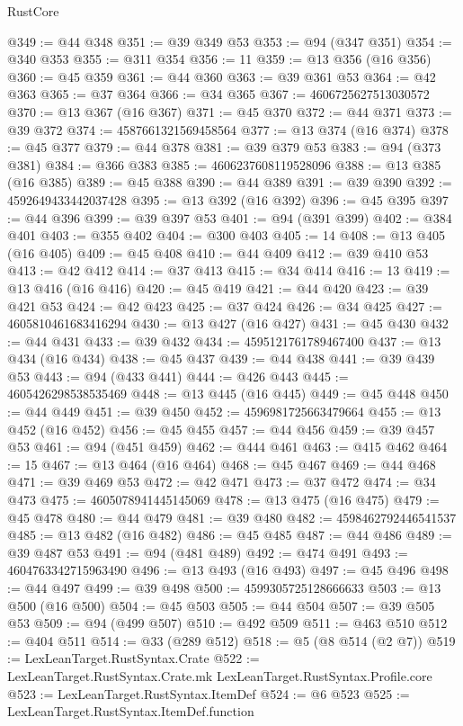 \begin{lexlean}{RustCore}
\begin{coremodule}
@349 := @44 @348
@351 := @39 @349 @53
@353 := @94 (@347 @351)
@354 := @340 @353
@355 := @311 @354
@356 := 11
@359 := @13 @356 (@16 @356)
@360 := @45 @359
@361 := @44 @360
@363 := @39 @361 @53
@364 := @42 @363
@365 := @37 @364
@366 := @34 @365
@367 := 4606725627513030572
@370 := @13 @367 (@16 @367)
@371 := @45 @370
@372 := @44 @371
@373 := @39 @372
@374 := 4587661321569458564
@377 := @13 @374 (@16 @374)
@378 := @45 @377
@379 := @44 @378
@381 := @39 @379 @53
@383 := @94 (@373 @381)
@384 := @366 @383
@385 := 4606237608119528096
@388 := @13 @385 (@16 @385)
@389 := @45 @388
@390 := @44 @389
@391 := @39 @390
@392 := 4592649433442037428
@395 := @13 @392 (@16 @392)
@396 := @45 @395
@397 := @44 @396
@399 := @39 @397 @53
@401 := @94 (@391 @399)
@402 := @384 @401
@403 := @355 @402
@404 := @300 @403
@405 := 14
@408 := @13 @405 (@16 @405)
@409 := @45 @408
@410 := @44 @409
@412 := @39 @410 @53
@413 := @42 @412
@414 := @37 @413
@415 := @34 @414
@416 := 13
@419 := @13 @416 (@16 @416)
@420 := @45 @419
@421 := @44 @420
@423 := @39 @421 @53
@424 := @42 @423
@425 := @37 @424
@426 := @34 @425
@427 := 4605810461683416294
@430 := @13 @427 (@16 @427)
@431 := @45 @430
@432 := @44 @431
@433 := @39 @432
@434 := 4595121761789467400
@437 := @13 @434 (@16 @434)
@438 := @45 @437
@439 := @44 @438
@441 := @39 @439 @53
@443 := @94 (@433 @441)
@444 := @426 @443
@445 := 4605426298538535469
@448 := @13 @445 (@16 @445)
@449 := @45 @448
@450 := @44 @449
@451 := @39 @450
@452 := 4596981725663479664
@455 := @13 @452 (@16 @452)
@456 := @45 @455
@457 := @44 @456
@459 := @39 @457 @53
@461 := @94 (@451 @459)
@462 := @444 @461
@463 := @415 @462
@464 := 15
@467 := @13 @464 (@16 @464)
@468 := @45 @467
@469 := @44 @468
@471 := @39 @469 @53
@472 := @42 @471
@473 := @37 @472
@474 := @34 @473
@475 := 4605078941445145069
@478 := @13 @475 (@16 @475)
@479 := @45 @478
@480 := @44 @479
@481 := @39 @480
@482 := 4598462792446541537
@485 := @13 @482 (@16 @482)
@486 := @45 @485
@487 := @44 @486
@489 := @39 @487 @53
@491 := @94 (@481 @489)
@492 := @474 @491
@493 := 4604763342715963490
@496 := @13 @493 (@16 @493)
@497 := @45 @496
@498 := @44 @497
@499 := @39 @498
@500 := 4599305725128666633
@503 := @13 @500 (@16 @500)
@504 := @45 @503
@505 := @44 @504
@507 := @39 @505 @53
@509 := @94 (@499 @507)
@510 := @492 @509
@511 := @463 @510
@512 := @404 @511
@514 := @33 (@289 @512)
@518 := @5 (@8 @514 (@2 @7))
@519 := LexLeanTarget.RustSyntax.Crate
@522 := LexLeanTarget.RustSyntax.Crate.mk LexLeanTarget.RustSyntax.Profile.core
@523 := LexLeanTarget.RustSyntax.ItemDef
@524 := @6 @523
@525 := LexLeanTarget.RustSyntax.ItemDef.function

\end{coremodule}
\end{lexlean}
